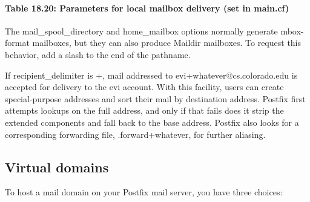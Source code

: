 \paragraph[{Table 18.20: }Parameters for local mailbox delivery (set in
{main.cf})]{\texorpdfstring{{Table 18.20:
}\protect\hypertarget{part0026_split_061.htmlux5cux23_idTextAnchor1181}{}{}\protect\hypertarget{part0026_split_061.htmlux5cux23_idTextAnchor1182}{}{}Parameters
for local mailbox delivery (set in
{main.cf}){\protect\hypertarget{part0026_split_061.htmlux5cux23_idIndexMarker2718}{}{}\protect\hypertarget{part0026_split_061.htmlux5cux23_idIndexMarker2719}{}{}\protect\hypertarget{part0026_split_061.htmlux5cux23_idIndexMarker2720}{}{}\protect\hypertarget{part0026_split_061.htmlux5cux23_idIndexMarker2721}{}{}\protect\hypertarget{part0026_split_061.htmlux5cux23_idIndexMarker2722}{}{}}}{Table 18.20: Parameters for local mailbox delivery (set in main.cf)}}


The {mail\_spool\_directory} and {home\_mailbox} options normally
generate {mbox}-format mailboxes, but they can also produce {Maildir}
mailboxes. To request this behavior, add a slash to the end of the
pathname.

If {recipient\_delimiter} is {+}, mail addressed to
evi+{whatever}@cs.colorado.edu is accepted for delivery to the evi
account. With this facility, users can create special-purpose addresses
and sort their mail by destination address. Postfix first attempts
lookups on the full address, and only if that fails does it strip the
extended components and fall back to the base address. Postfix also
looks for a corresponding forwarding file, {.forward+}{whatever}, for
further aliasing.

\protect\hypertarget{part0026_split_062.html}{}{}

\hypertarget{part0026_split_062.htmlux5cux23_idContainer1247}{}
\hypertarget{part0026_split_062.htmlux5cux23calibre_pb_61}{%
\subsection[Virtual
domains]{\texorpdfstring{\protect\hypertarget{part0026_split_062.htmlux5cux23_idTextAnchor1183}{}{}\protect\hypertarget{part0026_split_062.htmlux5cux23_idTextAnchor1184}{}{}Virtual
domains}{Virtual domains}}\label{part0026_split_062.htmlux5cux23calibre_pb_61}}

\protect\hypertarget{part0026_split_062.htmlux5cux23_idIndexMarker2723}{}{}To
host a mail domain on your Postfix mail server, you have three choices:


